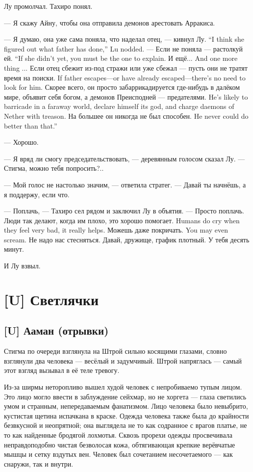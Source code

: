 Лу промолчал.
Тахиро понял.

--- Я скажу Айну, чтобы она отправила демонов арестовать Арракиса.

{--- Я думаю, она уже сама поняла, что наделал отец, --- кивнул Лу.}
{``I think she figured out what father has done,'' Lu nodded.}
{--- Если не поняла --- растолкуй ей.}
{``If she didn't yet, you must be the one to explain.}
{И ещё... }
{And one more thing ...}
{Если отец сбежит из-под стражи или уже сбежал --- пусть они не тратят время на поиски.}
{If father escapes---or have already escaped---there's no need to look for him.}
{Скорее всего, он просто забаррикадируется где-нибудь в далёком мире, объявит себя богом, а демонов Преисподней --- предателями.}
{He's likely to barricade in a faraway world, declare himself its god, and charge daemons of Nether with treason.}
{На большее он никогда не был способен.}
{He never could do better than that.''}

--- Хорошо.

--- Я вряд ли смогу председательствовать, --- деревянным голосом сказал Лу.
--- Стигма, можно тебя попросить?..

--- Мой голос не настолько значим, --- ответила стратег.
--- Давай ты начнёшь, а я поддержу, если что.

--- Поплачь, --- Тахиро сел рядом и заключил Лу в объятия.
--- Просто поплачь.
{Люди так делают, когда им плохо, это хорошо помогает.}
{Humans do cry when they feel very bad, it really helps.}
{Можешь даже покричать.}
{You may even scream.}
Не надо нас стесняться.
Давай, дружище, график плотный.
У тебя десять минут.

И Лу взвыл.

\chapter{[U] Светлячки}

\section{[U] Ааман (отрывки)}

Стигма по очереди взглянула на Штрой сильно косящими глазами, словно взглянули два человека --- весёлый и задумчивый.
Штрой напряглась --- самый этот взгляд вызывал в её теле тревогу.

Из-за ширмы неторопливо вышел худой человек с непробиваемо тупым лицом.
Это лицо могло ввести в заблуждение сейхмар, но не хоргета --- глаза светились умом и странным, непередаваемым фанатизмом.
Лицо человека было невыбрито, кустистая щетина испачкана в краске.
Одежда человека также была до крайности безвкусной и неопрятной;
она выглядела не то как содранное с врагов платье, не то как найденные бродягой лохмотья.
Сквозь прорехи одежды просвечивала неправдоподобно чистая безволосая кожа, обтягивающая крепкие верёвчатые мышцы и сетку вздутых вен.
Человек был сочетанием несочетаемого --- как снаружи, так и внутри.

